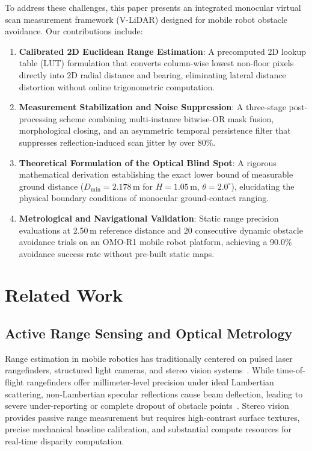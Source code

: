 \documentclass[12pt]{iopart}
\begin{document}
To address these challenges, this paper presents an integrated monocular virtual scan measurement framework (V-LiDAR) designed for mobile robot obstacle avoidance. Our contributions include:
\begin{enumerate}
  \item \textbf{Calibrated 2D Euclidean Range Estimation}: A precomputed 2D lookup table (LUT) formulation that converts column-wise lowest non-floor pixels directly into 2D radial distance and bearing, eliminating lateral distance distortion without online trigonometric computation.
  \item \textbf{Measurement Stabilization and Noise Suppression}: A three-stage post-processing scheme combining multi-instance bitwise-OR mask fusion, morphological closing, and an asymmetric temporal persistence filter that suppresses reflection-induced scan jitter by over 80\%.
  \item \textbf{Theoretical Formulation of the Optical Blind Spot}: A rigorous mathematical derivation establishing the exact lower bound of measurable ground distance ($D_{\min} = 2.178$\,m for $H = 1.05$\,m, $\theta = 2.0^\circ$), elucidating the physical boundary conditions of monocular ground-contact ranging.
  \item \textbf{Metrological and Navigational Validation}: Static range precision evaluations at 2.50\,m reference distance and 20 consecutive dynamic obstacle avoidance trials on an OMO-R1 mobile robot platform, achieving a 90.0\% avoidance success rate without pre-built static maps.
\end{enumerate}

\section{Related Work}
\label{sec:related_work}

\subsection{Active Range Sensing and Optical Metrology}
Range estimation in mobile robotics has traditionally centered on pulsed laser rangefinders, structured light cameras, and stereo vision systems~\cite{li_2020_lidar,thrun_2010_probabilistic}. While time-of-flight rangefinders offer millimeter-level precision under ideal Lambertian scattering, non-Lambertian specular reflections cause beam deflection, leading to severe under-reporting or complete dropout of obstacle points~\cite{deepthadamodaran_2023_experimental}. Stereo vision provides passive range measurement but requires high-contrast surface textures, precise mechanical baseline calibration, and substantial compute resources for real-time disparity computation.
\end{document}

